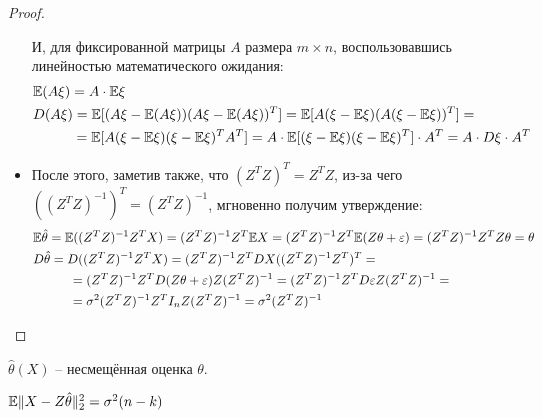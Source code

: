 \begin{proof}
\begin{itemize}
        И, для фиксированной матрицы $A$ размера $m \times n$, воспользовавшись линейностью математического ожидания:
        \begin{align*}
            & \mathbb{E} (A\xi) = A \cdot \mathbb{E} \xi
            \\
            & D (A \xi) = \mathbb{E} [(A\xi - \mathbb{E}(A\xi))(A\xi - \mathbb{E}(A\xi))^T] = \mathbb{E} [A (\xi - \mathbb{E}\xi) (A (\xi - \mathbb{E}\xi))^T] =
            \\
            & \hspace{1cm} = \mathbb{E} [A (\xi-\mathbb{E}\xi)(\xi-\mathbb{E}\xi)^T A^T] = A \cdot \mathbb{E}[(\xi-\mathbb{E}\xi)(\xi-\mathbb{E}\xi)^T] \cdot A^T = A \cdot D\xi \cdot A^T
        \end{align*}

        \item После этого, заметив также, что $(Z^T Z)^T = Z^T Z$, из-за чего $((Z^T Z)^{-1})^T = (Z^T Z)^{-1}$, мгновенно получим утверждение:
        \begin{align*}
            & \mathbb{E} \hat{\theta} = \mathbb{E} ((Z^T Z)^{-1} Z^T X) = (Z^T Z)^{-1} Z^T \mathbb{E} X = (Z^T Z)^{-1} Z^T \mathbb{E} (Z \theta + \varepsilon) = (Z^T Z)^{-1} Z^T Z \theta = \theta
            \\
            & D \hat{\theta} = D ((Z^T Z)^{-1} Z^T X) = (Z^T Z)^{-1} Z^T DX ((Z^T Z)^{-1} Z^T)^T =
            \\
            & \hspace{1cm} = (Z^T Z)^{-1} Z^T D(Z \theta + \varepsilon) Z (Z^T Z)^{-1} = (Z^T Z)^{-1} Z^T D\varepsilon Z (Z^T Z)^{-1} =
            \\
            & \hspace{1cm} = \sigma^2 (Z^T Z)^{-1} Z^T I_n Z (Z^T Z)^{-1} = \sigma^2 (Z^T Z)^{-1}
        \end{align*}       
    \end{itemize}
\end{proof}

\begin{corollary}
    $\hat{\theta}(X)$ -- несмещённая оценка $\theta$.
\end{corollary}

\begin{proposition}
    $\mathbb{E} \|X - Z\hat{\theta}\|_2^2 = \sigma^2(n-k)$
\end{proposition}

